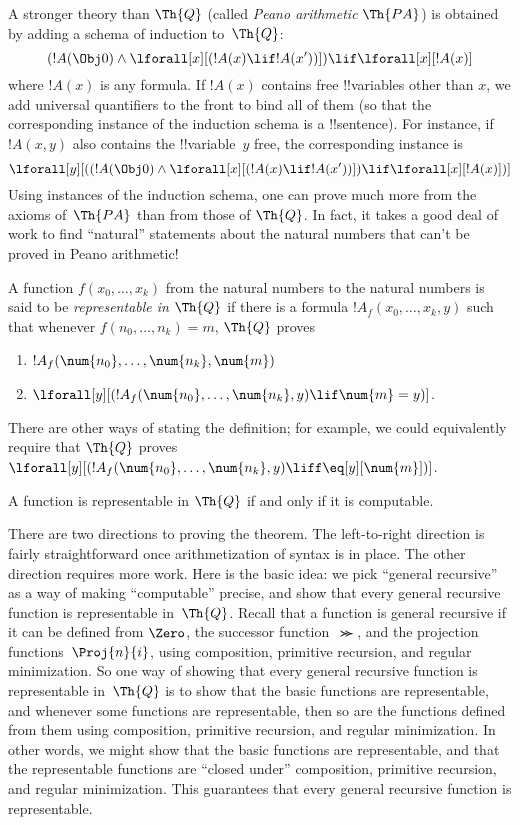\documentclass[../../../include/open-logic-section]{subfiles}
\begin{document}
A stronger theory than $\Th{Q}$ (called \emph{Peano arithmetic} $\Th{PA}$)
is obtained by adding a schema of induction to~$\Th{Q}$:
\[
(!A(\Obj 0) \land \lforall[x][(!A(x) \lif !A(x'))]) \lif \lforall[x][!A(x)]
\]
where $!A(x)$ is any formula. If $!A(x)$ contains free !!{variable}s
other than $x$, we add universal quantifiers to the front to bind all
of them (so that the corresponding instance of the induction schema is
a !!{sentence}). For instance, if $!A(x, y)$ also contains the
!!{variable}~$y$ free, the corresponding instance is
\[
\lforall[y][((!A(\Obj 0) \land \lforall[x][(!A(x) \lif !A(x'))]) \lif
  \lforall[x][!A(x)])]
\]
Using instances of the induction schema, one can prove much more from
the axioms of~$\Th{PA}$ than from those of $\Th{Q}$. In fact, it takes
a good deal of work to find ``natural'' statements about the natural
numbers that can't be proved in Peano arithmetic!{}

\begin{defn}
  A function $f(x_0,\ldots,x_k)$ from the natural numbers to
  the natural numbers is said to be {\em representable in $\Th{Q}$} if
  there is a formula $!A_f(x_0,\dots,x_k,y)$ such that whenever
  $f(n_0,\dots,n_k) = m$, $\Th{Q}$ proves
\begin{enumerate}
\item{} $!A_f(\num{n_0}, \dots, \num{n_k}, \num{m})$
\item{} $\lforall[y][(!A_f(\num{n_0}, \dots,
\num{n_k}, y) \lif \num{m} = y)]$.
\end{enumerate}
\end{defn}

There are other ways of stating the definition; for example, we could
equivalently require that $\Th{Q}$ proves $\lforall[y][(!A_f(\num{n_0}, \dots,
\num{n_k}, y) \liff \eq[y][\num{m}])]$.

\begin{thm}
A function is representable in $\Th{Q}$ if and only if it is computable.
\end{thm}

There are two directions to proving the theorem. The left-to-right
direction is fairly straightforward once arithmetization of syntax is
in place. The other direction requires more work.  Here is the basic
idea: we pick ``general recursive'' as a way of making ``computable''
precise, and show that every general recursive function is
representable in~$\Th{Q}$. Recall that a function is general recursive
if it can be defined from $\Zero$, the successor function~$\Succ$, and the
projection functions~$\Proj{n}{i}$, using composition, primitive recursion,
and regular minimization. So one way of showing that every general
recursive function is representable in~$\Th{Q}$ is to show that the
basic functions are representable, and whenever some functions are
representable, then so are the functions defined from them using
composition, primitive recursion, and regular minimization. In other
words, we might show that the basic functions are representable, and
that the representable functions are ``closed under'' composition,
primitive recursion, and regular minimization.  This guarantees that
every general recursive function is representable.
\end{document}
